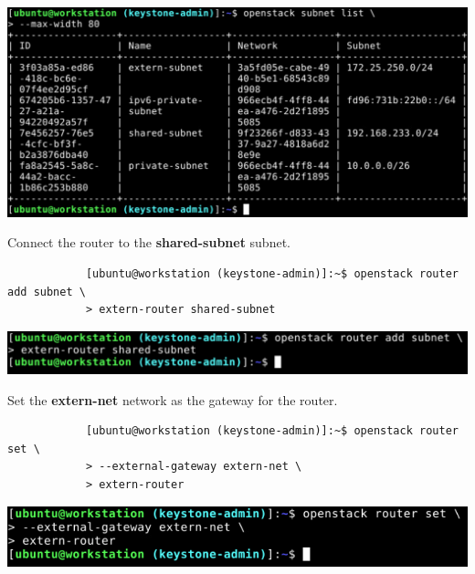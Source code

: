 \documentclass[letterpaper, 12pt]{article}
\begin{document}
\begin{enumerate}
\begin{labstep}
        \begin{center}
            \includegraphics[width=\linewidth]{images/part1/step17.png}
        \end{center}
    \end{labstep}

    \begin{labstep}
        Connect the router to the \textbf{shared-subnet} subnet.
        \begin{lstlisting}
            [ubuntu@workstation (keystone-admin)]:~$ openstack router add subnet \
            > extern-router shared-subnet
        \end{lstlisting}

        \begin{center}
            \includegraphics[width=\linewidth]{images/part1/step18.png}
        \end{center}
    \end{labstep}

    \begin{labstep}
        Set the \textbf{extern-net} network as the gateway for the router.
        \begin{lstlisting}
            [ubuntu@workstation (keystone-admin)]:~$ openstack router set \
            > --external-gateway extern-net \
            > extern-router
        \end{lstlisting}

        \begin{center}
            \includegraphics[width=\linewidth]{images/part1/step19.png}
        \end{center}
    \end{labstep}


\end{enumerate}
\end{document}
